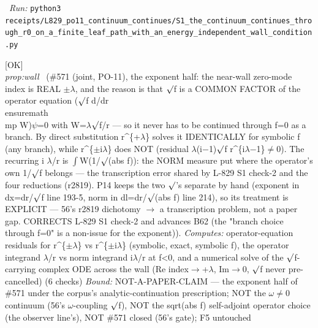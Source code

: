 \begin{description}
\ \emph{Run:} \texttt{python3 receipts/L829\_po11\_continuum\_continues/S1\_the\_continuum\_continues\_through\_r0\_on\_a\_finite\_leaf\_path\_with\_an\_energy\_independent\_wall\_condition.py}
\item[\label{rcpt:S3_the_wall_index_is_real_because_sqrt_f_factors_out_of_the_operator_not_the_norm}\texttt{S3\_the\_wall\_index\_is\_real\_because\_sqrt\_f\_factors\_out\_of\_the\_operator\_not\_the\_norm}]\hfill\textsf{[OK]}\\
\textit{prop:wall} \ (\#571 (joint, PO-11), the exponent half: the near-wall zero-mode index is REAL \ensuremath{\pm}\ensuremath{\lambda}, and the reason is that \ensuremath{\surd}f is a COMMON FACTOR of the operator equation (\ensuremath{\surd}f d/dr \\ensuremath{\\mp} W)\ensuremath{\psi}=0 with W=\ensuremath{\lambda}\ensuremath{\surd}f/r --- so it never has to be continued through f=0 as a branch. By direct substitution r\textasciicircum{}\{+\ensuremath{\lambda}\} solves it IDENTICALLY for symbolic f (any branch), while r\textasciicircum{}\{\ensuremath{\pm}i\ensuremath{\lambda}\} does NOT (residual \ensuremath{\lambda}(i\ensuremath{-}1)\ensuremath{\surd}f r\textasciicircum{}\{i\ensuremath{\lambda}\ensuremath{-}1\}\ensuremath{\ne}0). The recurring i \ensuremath{\lambda}/r is \ensuremath{\int}W(1/\ensuremath{\surd}(abs f)): the NORM measure put where the operator's own 1/\ensuremath{\surd}f belongs --- the transcription error shared by L-829 S1 check-2 and the four reductions (r2819). P14 keeps the two \ensuremath{\surd}'s separate by hand (exponent in dx=dr/\ensuremath{\surd}f line 193-5, norm in dl=dr/\ensuremath{\surd}(abs f) line 214), so its treatment is EXPLICIT --- 56's r2819 dichotomy \ensuremath{\to} a transcription problem, not a paper gap. CORRECTS L-829 S1 check-2 and advances B62 (the "branch choice through f=0" is a non-issue for the exponent)). 
\emph{Computes:} operator-equation residuals for r\textasciicircum{}\{\ensuremath{\pm}\ensuremath{\lambda}\} vs r\textasciicircum{}\{\ensuremath{\pm}i\ensuremath{\lambda}\} (symbolic, exact, symbolic f), the operator integrand \ensuremath{\lambda}/r vs norm integrand i\ensuremath{\lambda}/r at f<0, and a numerical solve of the \ensuremath{\surd}f-carrying complex ODE across the wall (Re index\ensuremath{\to}+\ensuremath{\lambda}, Im\ensuremath{\to}0, \ensuremath{\surd}f never pre-cancelled) (6 checks)
 \emph{Bound:} NOT-A-PAPER-CLAIM --- the exponent half of \#571 under the corpus's analytic-continuation prescription; NOT the \ensuremath{\omega}\ensuremath{\ne}0 continuum (56's \ensuremath{\omega}-coupling \ensuremath{\surd}f), NOT the sqrt(abs f) self-adjoint operator choice (the observer line's), NOT \#571 closed (56's gate); F5 untouched

\end{description}
